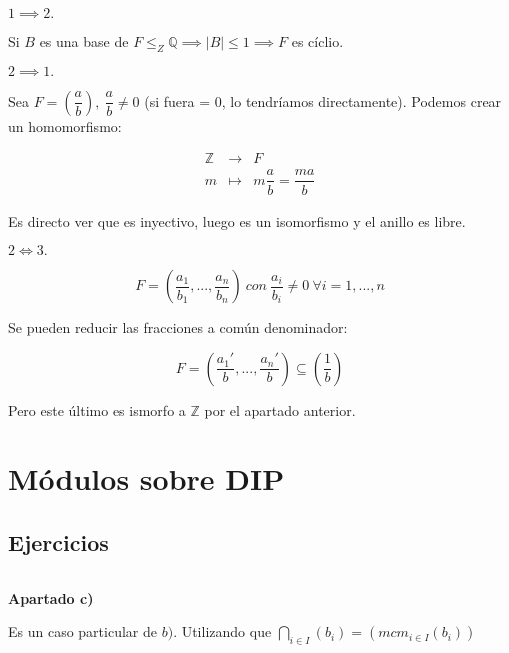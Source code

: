 \documentclass[openany]{book}
\begin{document}
\begin{exercise}
    $ $

    \noindent $ 1\implies 2.$

    Si $ B$ es una base de $ F \leq _{Z}\mathbb{Q} \implies |B| \leq  1 \implies F$ es cíclio.

    \noindent $ 2 \implies 1.$

    Sea $ F = \left(\dfrac{a}{b}\right),\ \dfrac{a}{b} \ne 0$ (si fuera = 0, lo tendríamos directamente). Podemos crear un homomorfismo:

    $$ 
    \begin{aligned}
        \mathbb{Z} &  \to &  F\\ 
        m & \mapsto & m \dfrac{a}{b} = \dfrac{ma}{b}
    \end{aligned}
    $$

    Es directo ver que es inyectivo, luego es un isomorfismo y el anillo es libre.

    \noindent $ 2\iff 3.$

    $$ F = \left( \dfrac{a_1}{b_1},..., \dfrac{a_n}{b_n} \right)\  con\ \dfrac{a_i}{b_i} \ne 0 \ \forall i = 1,...,n $$

    Se pueden reducir las fracciones a común denominador:

    $$ F = \left( \dfrac{a_1'}{b},...,\dfrac{a_n'}{b} \right) \subseteq  \left(\dfrac{1}{b}\right) $$

    Pero este último es ismorfo a $ \mathbb{Z}$ por el apartado anterior.

\end{exercise}

\chapter{Módulos sobre DIP}

\section{Ejercicios}



\setcounter{ex}{1}

\begin{exercise}
    $ $

    \begin{flushright}
        \textbf{Apartado c)}
    \end{flushright}
    
    Es un caso particular de $ b)$.  Utilizando que $ \bigcap_{i \in I}(b_i) = (mcm_{i \in I}(b_i))$ 

\end{exercise}
\end{document}

